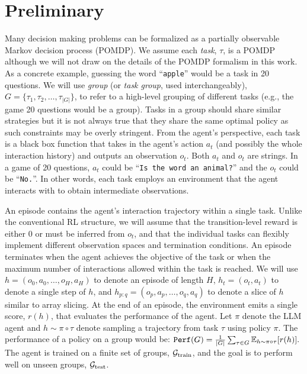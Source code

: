 

\section{Preliminary}

Many decision making problems can be formalized as a partially observable Markov decision process (POMDP). We assume each \emph{task}, $\tau$, is a POMDP although we will not draw on the details of the POMDP formalism in this work. As a concrete example, guessing the word ``\texttt{apple}'' would be a task in 20 questions.
We will use \emph{group} (or \emph{task group}, used interchangeably), $G=\{\tau_1, \tau_2, \dots, \tau_{|G|}\}$, to refer to a high-level grouping of different tasks (e.g., the game 20 questions would be a group). 
Tasks in a group should share similar strategies but it is not always true that they share the same optimal policy as such constraints may be overly stringent.
From the agent's perspective, each task is a black box function that takes in the agent's action $a_t$ (and possibly the whole interaction history) and outputs an observation $o_t$. Both $a_t$ and $o_t$ are strings. In a game of 20 questions, $a_t$ could be ``\texttt{Is the word an animal?}'' and the $o_t$ could be ``\texttt{No.}''. In other words, each task employs an environment that the agent interacts with to obtain intermediate observations.

An episode contains the agent's interaction trajectory within a single task.
Unlike the conventional RL structure, we will assume that the transition-level reward is either $0$ or must be inferred from $o_t$, and that the individual tasks can flexibly implement different observation spaces and termination conditions.
An episode terminates when the agent achieves the objective of the task or when the maximum number of interactions allowed within the task is reached.
We will use $h = (o_0, a_0, \dots, o_H, a_H)$ to denote an episode of length $H$, $h_t = (o_t, a_t)$ to denote a single step of $h$, and $h_{p:q} = (o_{p}, a_{p}, \dots, o_{q}, a_{q})$ to denote a slice of $h$ similar to array slicing.
At the end of an episode, the environment emits a single score, $r(h)$, that evaluates the performance of the agent.
Let $\pi$ denote the LLM agent and $h \sim \pi \circ \tau$ denote sampling a trajectory from task $\tau$ using policy $\pi$. The performance of a policy on a group would be:
$
    \texttt{Perf}(G) = \tfrac{1}{|G|}\sum_{\tau \in G} \mathbb{E}_{h\sim \pi \circ \tau}[r(h)].
$
The agent is trained on a finite set of groups, ${\mathcal{G}}_\text{train}$, and the goal is to perform well on unseen groups, ${\mathcal{G}}_\text{test}$. 
